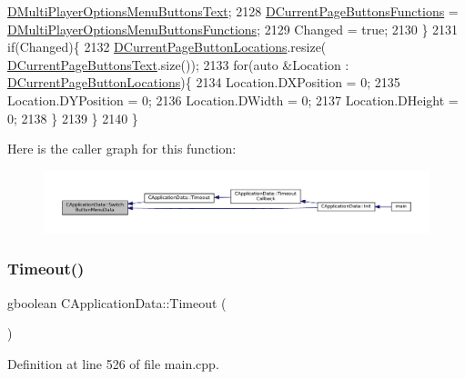 \begin{DoxyCode}
      \hyperlink{classCApplicationData_a400aa1df18482fe5d9f34e861a0dc257}{DMultiPlayerOptionsMenuButtonsText};
2128         \hyperlink{classCApplicationData_ad3079e5563a19d21c1e4ceff2a188382}{DCurrentPageButtonsFunctions} = 
      \hyperlink{classCApplicationData_ad32d3cc90fd1ead1574cb6c336257e1c}{DMultiPlayerOptionsMenuButtonsFunctions};
2129         Changed = \textcolor{keyword}{true};
2130     \}
2131     \textcolor{keywordflow}{if}(Changed)\{
2132         \hyperlink{classCApplicationData_a3615df8e23cea3ce17f11cf61340a7b4}{DCurrentPageButtonLocations}.resize(
      \hyperlink{classCApplicationData_af04b7f5f8ba4e5c99c0a3530055fc15d}{DCurrentPageButtonsText}.size());
2133         \textcolor{keywordflow}{for}(\textcolor{keyword}{auto} &Location : \hyperlink{classCApplicationData_a3615df8e23cea3ce17f11cf61340a7b4}{DCurrentPageButtonLocations})\{
2134             Location.DXPosition = 0;
2135             Location.DYPosition = 0;
2136             Location.DWidth = 0;
2137             Location.DHeight = 0;
2138         \}
2139     \}
2140 \}
\end{DoxyCode}
Here is the caller graph for this function\+:
\nopagebreak
\begin{figure}[H]
\begin{center}
\leavevmode
\includegraphics[width=350pt]{classCApplicationData_a2a464fd480c791ab13a1b1ca855e4578_icgraph}
\end{center}
\end{figure}
\hypertarget{classCApplicationData_aae0775b38fac01308e8a81b64db49500}{}\label{classCApplicationData_aae0775b38fac01308e8a81b64db49500} 
\subsubsection{\texorpdfstring{Timeout()}{Timeout()}}
{\footnotesize\ttfamily gboolean C\+Application\+Data\+::\+Timeout (\begin{DoxyParamCaption}{ }\end{DoxyParamCaption})\hspace{0.3cm}{\ttfamily [protected]}}



Definition at line 526 of file main.\+cpp.


